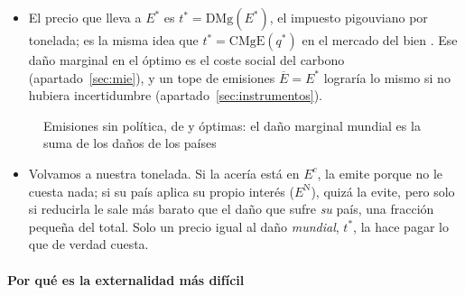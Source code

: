 \documentclass[11pt]{article}
\begin{document}
\begin{itemize}
\begin{itemize}
  \item $E^*$: el óptimo mundial, donde $\mathrm{CMgR}(E^*)=\mathrm{DMg}(E^*)$.
  \end{itemize}
  Se cumple $E^c>E^{\mathrm{N}}>E^*$: aunque cada país haga lo que le conviene, el mundo emite demasiado. La distancia entre $E^{\mathrm{N}}$ y $E^*$ es el .
\item El precio que lleva a $E^*$ es $t^*=\mathrm{DMg}(E^*)$, el impuesto pigouviano por tonelada; es la misma idea que $t^*=\mathrm{CMgE}(q^*)$ en el mercado del bien . Ese daño marginal en el óptimo es el coste social del carbono (apartado~\ref{sec:mie}), y un tope de emisiones $\overline{E}=E^*$ lograría lo mismo si no hubiera incertidumbre (apartado~\ref{sec:instrumentos}).
\end{itemize}

\begin{figure}[H]
\centering
\caption{Emisiones sin política, de  y óptimas: el daño marginal mundial es la suma de los daños de los países}\label{fig:emisiones-optimas}
\end{figure}

\begin{itemize}
\item Volvamos a nuestra tonelada. Si la acería está en $E^c$, la emite porque no le cuesta nada; si su país aplica su propio interés ($E^{\mathrm{N}}$), quizá la evite, pero solo si reducirla le sale más barato que el daño que sufre \emph{su} país, una fracción pequeña del total. Solo un precio igual al daño \emph{mundial}, $t^*$, la hace pagar lo que de verdad cuesta.
\end{itemize}

\paragraph{Por qué es la externalidad más difícil}
\end{document}
